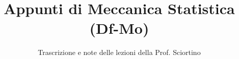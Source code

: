 \documentclass[a4paper,12pt]{article}
\title{Appunti di Meccanica Statistica (Df-Mo)}
\author{Trascrizione e note delle lezioni della Prof. Sciortino}
\date{}
\begin{document}
\maketitle
\projectintro
\tableofcontents
\newpage

\end{document}
